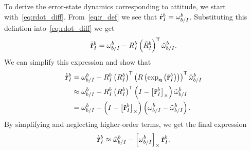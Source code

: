 To derive the error-state dynamics corresponding to attitude, we start
with~\eqref{eq:rdot_diff}. From~\eqref{eq:r_def} we see that $\dot{\mathrm{\mathbf{r}}}_I^b
= \mathrm{\mathbf{\omega}}_{b/I}^b$. Substituting this defintion into~\eqref{eq:rdot_diff}
we get
\begin{equation}
\dot{\tilde{\mathrm{\mathbf{r}}}}_I^b = \mathrm{\mathbf{\omega}}_{b/I}^{b} -
R_I^b\left(\check{R}_I^b\right)^{\mathsf{T}} \check{\mathrm{\mathbf{\omega}}}_{b/I}^{b}.
\end{equation}
We can simplify this expression and show that
\begin{align}
  \dot{\tilde{\mathrm{\mathbf{r}}}}_I^b &= \mathrm{\mathbf{\omega}}_{b/I}^{b} -
  R_I^b 
  \left(R_{I}^{b}\right)^{\mathsf{T}}
  \left(R\left(\exp_{\mathrm{\mathbf{q}}}\left(\tilde{\mathrm{\mathbf{r}}}_{I}^{b}\right)\right)\right)^{\mathsf{T}}
  \check{\mathrm{\mathbf{\omega}}}_{b/I}^{b} \\
  &\approx \mathrm{\mathbf{\omega}}_{b/I}^{b} -
  R_I^b \left(R_{I}^{b}\right)^{\mathsf{T}} \left( I - \left[ \tilde{\mathrm{\mathbf{r}}}_I^b \right]_{\times}
  \right) \check{\mathrm{\mathbf{\omega}}}_{b/I}^{b} \\
  &= \mathrm{\mathbf{\omega}}_{b/I}^{b} -
  \left( I - \left[ \tilde{\mathrm{\mathbf{r}}}_I^b \right]_{\times}
  \right) \left(\mathrm{\mathbf{\omega}}_{b/I}^{b} - \tilde{\mathrm{\mathbf{\omega}}}_{b/I}^{b}\right).
\end{align}
By simplifying and neglecting higher-order terms, we get the final expression
\begin{equation}
  \dot{\tilde{\mathrm{\mathbf{r}}}}_I^b \approx \tilde{\mathrm{\mathbf{\omega}}}_{b/I}^{b} -
  \left[ \mathrm{\mathbf{\omega}}_{b/I}^{b}  \right]_{\times} \tilde{\mathrm{\mathbf{r}}}_I^b.
\end{equation}


